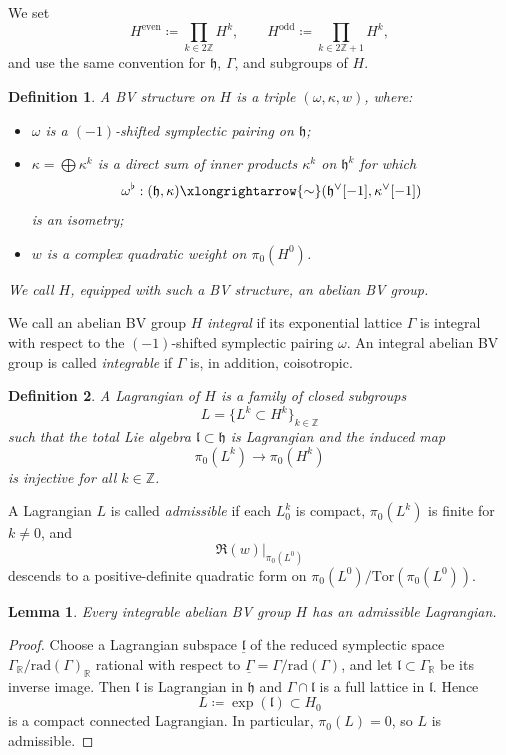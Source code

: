 \documentclass[12pt]{amsart}
\numberwithin{table}{section}
\numberwithin{equation}{section}
\newtheorem{defn}{Definition}[section]
\newtheorem{lem}{Lemma}[section]
\theoremstyle{plain}
\newcommand{\fh}{\mathfrak{h}}
\newcommand{\fl}{\mathfrak{l}}
\newcommand{\R}{\mathbb{R}}
\newcommand{\Z}{\mathbb{Z}}
\newcommand{\rad}{\mathrm{rad}}
\newcommand{\Tor}{\mathrm{Tor}}
\begin{document}
We set
\[
H^{\mathrm{even}} \coloneq \prod_{k\in2\Z}H^k,
\qquad
H^{\mathrm{odd}} \coloneq \prod_{k\in2\Z+1}H^k,
\]
and use the same convention for $\fh$, $\Gamma$, and subgroups of $H$.


\begin{defn}\label{def:abelian-BV-group}
A \emph{BV structure} on $H$ is a triple $(\omega,\kappa,w)$, where:
\begin{itemize}[leftmargin=2em]
\item $\omega$ is a $(-1)$-shifted symplectic pairing on $\fh$;
\item $\kappa = \bigoplus \kappa^k$ is a direct sum of inner products $\kappa^k$ on $\fh^k$ for which
\[
\omega^\flat:(\fh,\kappa)\xlongrightarrow{\sim}(\fh^\vee[-1],\kappa^\vee[-1])
\]
is an isometry;
\item $w$ is a complex quadratic weight on $\pi_0(H^0)$. 
\end{itemize}
We call $H$, equipped with such a BV structure, an \emph{abelian BV group}.
\end{defn}

We call an abelian BV group $H$ \emph{integral} if its exponential lattice $\Gamma$ is integral with respect to the $(-1)$-shifted symplectic pairing $\omega$. An integral abelian BV group is called \emph{integrable} if $\Gamma$ is, in addition, coisotropic.

\begin{defn}
	A \emph{Lagrangian} of $H$ is a family of closed subgroups
	\[
	L=\{L^k\subset H^k\}_{k\in\Z}
	\]
	such that the total Lie algebra $\fl\subset\fh$ is Lagrangian and the induced map
	\[
	\pi_0(L^k)\longrightarrow\pi_0(H^k)
	\]
	is injective for all $k\in\Z$.
\end{defn}

A Lagrangian $L$ is called \emph{admissible} if each $L_0^k$ is compact, $\pi_0(L^k)$ is finite for $k\neq 0$, and
\[
\Re(w)\big|_{\pi_0(L^0)}
\]
descends to a positive-definite quadratic form on $\pi_0(L^0)/\Tor(\pi_0(L^0))$. 

\begin{lem}
	Every integrable abelian BV group $H$ has an admissible Lagrangian.
\end{lem}

\begin{proof}
	Choose a Lagrangian subspace $\underline{\fl}$ of the reduced symplectic space $\Gamma_\R/\rad(\Gamma)_\R$ rational with respect to $\underline\Gamma = \Gamma/\rad(\Gamma)$, and let $\fl \subset\Gamma_\R$ be its inverse
	image. Then $\fl$ is Lagrangian in $\fh$ and $\Gamma\cap\fl$ is a full lattice
	in $\fl$. Hence
	\[
	L \coloneq \exp(\fl)\subset H_0
	\]
	is a compact connected Lagrangian. In particular, $\pi_0(L)=0$, so $L$ is admissible.
\end{proof}
\end{document}
